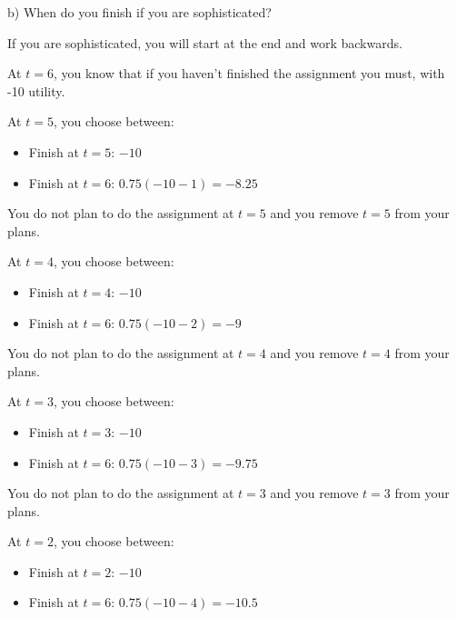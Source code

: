 \documentclass[
  letterpaper,
  DIV=11,
  numbers=noendperiod]{scrreprt}
\providecommand{\tightlist}{%
  \setlength{\itemsep}{0pt}\setlength{\parskip}{0pt}}\usepackage{longtable,booktabs,array}
\begin{document}
b) When do you finish if you are sophisticated?

\begin{tcolorbox}[enhanced jigsaw, title=\textcolor{quarto-callout-tip-color}{\faLightbulb}\hspace{0.5em}{Answer}, toprule=.15mm, colback=white, breakable, titlerule=0mm, colframe=quarto-callout-tip-color-frame, coltitle=black, opacityback=0, rightrule=.15mm, colbacktitle=quarto-callout-tip-color!10!white, bottomtitle=1mm, opacitybacktitle=0.6, arc=.35mm, bottomrule=.15mm, toptitle=1mm, leftrule=.75mm, left=2mm]

If you are sophisticated, you will start at the end and work backwards.

At \(t=6\), you know that if you haven't finished the assignment you
must, with -10 utility.

At \(t=5\), you choose between:

\begin{itemize}
\tightlist
\item
  Finish at \(t=5\): \(-10\)
\item
  Finish at \(t=6\): \(0.75(-10-1)=-8.25\)
\end{itemize}

You do not plan to do the assignment at \(t=5\) and you remove \(t=5\)
from your plans.

At \(t=4\), you choose between:

\begin{itemize}
\tightlist
\item
  Finish at \(t=4\): \(-10\)
\item
  Finish at \(t=6\): \(0.75(-10-2)=-9\)
\end{itemize}

You do not plan to do the assignment at \(t=4\) and you remove \(t=4\)
from your plans.

At \(t=3\), you choose between:

\begin{itemize}
\tightlist
\item
  Finish at \(t=3\): \(-10\)
\item
  Finish at \(t=6\): \(0.75(-10-3)=-9.75\)
\end{itemize}

You do not plan to do the assignment at \(t=3\) and you remove \(t=3\)
from your plans.

At \(t=2\), you choose between:

\begin{itemize}
\tightlist
\item
  Finish at \(t=2\): \(-10\)
\item
  Finish at \(t=6\): \(0.75(-10-4)=-10.5\)
\end{itemize}


\end{tcolorbox}
\end{document}
